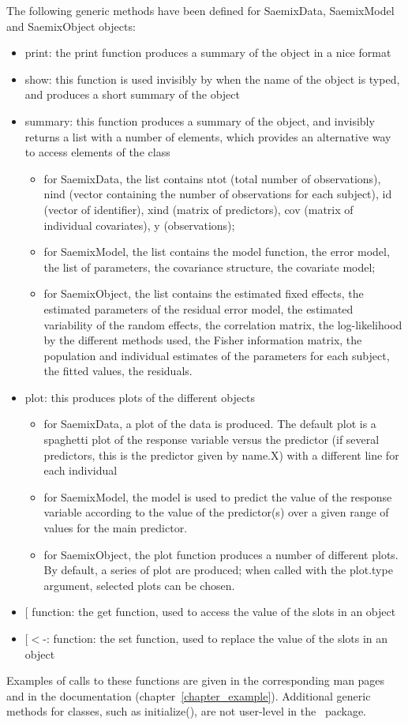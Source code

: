 The following generic methods have been defined for {\sf SaemixData}, {\sf SaemixModel} and {\sf SaemixObject} objects:
\begin{itemize}
\item print: the print function produces a summary of the object in a nice format
\item show: this function is used invisibly by \R when the name of the object is typed, and produces a short summary of the object
\item summary: this function produces a summary of the object, and invisibly returns a list with a number of elements, which provides an alternative way to access elements of the class
   \begin{itemize}
   \item for {\sf SaemixData}, the list contains ntot (total number of observations), nind (vector containing the number of observations for each subject), id (vector of identifier), xind (matrix of predictors), cov (matrix of individual covariates), y (observations);
   \item for {\sf SaemixModel}, the list contains the model function, the error model, the list of parameters, the covariance structure, the covariate model;
   \item for {\sf SaemixObject}, the list contains the estimated fixed effects, the estimated parameters of the residual error model, the estimated variability of the random effects, the correlation matrix, the log-likelihood by the different methods used, the Fisher information matrix, the population and individual estimates of the parameters for each subject, the fitted values, the residuals.
   \end{itemize}
\item plot: this produces plots of the different objects
   \begin{itemize}
   \item for {\sf SaemixData}, a plot of the data is produced. The default plot is a spaghetti plot of the response variable versus the predictor (if several predictors, this is the predictor given by name.X) with a different line for each individual
   \item for {\sf SaemixModel}, the model is used to predict the value of the response variable according to the value of the predictor(s) over a given range of values for the main predictor.
   \item for {\sf SaemixObject}, the plot function produces a number of different plots. By default, a series of plot are produced; when called with the {\sf plot.type} argument, selected plots can be chosen.
   \end{itemize}
\item $[$ function: the get function, used to access the value of the slots in an object
\item $[<$-: function: the set function, used to replace the value of the slots in an object
\end{itemize}
Examples of calls to these functions are given in the corresponding man pages and in the documentation (chapter~\ref{chapter_example}). Additional generic methods for classes, such as {\sf initialize()}, are not user-level in the \saemix~package.

